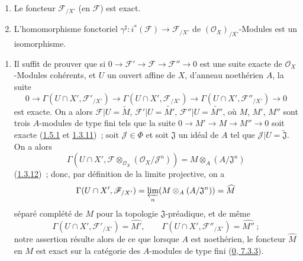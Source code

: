 \begin{proposition}[10.8.8]
\label{I.10.8.8-fr}
\medskip\noindent
\begin{enumerate}
  \item[\rm{(i)}] Le foncteur $\mathscr{F}_{/X'}$ (en $\mathscr{F}$) est
    exact.
  \item[\rm{(ii)}] L'homomorphisme fonctoriel
    $\gamma^\sharp:i^*(\mathscr{F})\to\mathscr{F}_{/X'}$ de
    $(\mathscr{O}_X)_{/X'}$-Modules est un isomorphisme.
\end{enumerate}
\end{proposition}

\medskip\noindent
\begin{enumerate}
  \item[\rm{(i)}] Il suffit de prouver que si
    $0\to\mathscr{F}'\to\mathscr{F}\to\mathscr{F}''\to0$ est une suite
    exacte de $\mathscr{O}_X$-Modules cohérents, et $U$ un ouvert affine
    de $X$, d'anneau noethérien $A$, la suite
    \[
      0\to\Gamma(U\cap X',\mathscr{F}'_{/X'})
      \to\Gamma(U\cap X',\mathscr{F}_{/X'})
      \to\Gamma(U\cap X',\mathscr{F}''_{/X'})\to0
    \]
    est exacte. On a alors $\mathscr{F}|U=\widetilde M$,
    $\mathscr{F}'|U=\widetilde{M'}$, $\mathscr{F}''|U=\widetilde{M''}$,
    où $M$, $M'$, $M''$ sont trois $A$-modules de type fini tels que la
    suite $0\to M'\to M\to M''\to0$ soit exacte
    (\hyperref[I.1.5.1-fr]{1.5.1} et
    \hyperref[I.1.3.11-fr]{1.3.11})~; soit $\mathscr{J}\in\Phi$ et soit
    $\mathfrak{J}$ un idéal de $A$ tel que
    $\mathscr{J}|U=\widetilde{\mathfrak{J}}$. On a alors
    \[
      \Gamma(U\cap X',
      \mathscr{F}\otimes_{\mathscr{O}_X}(\mathscr{O}_X/\mathscr{J}^n))
      =M\otimes_A(A/\mathfrak{J}^n)
    \]
    (\hyperref[I.1.3.12-fr]{1.3.12})~; donc, par définition de la limite
    projective, on a
    \[
      \Gamma(U\cap X',\mathscr{F}_{/X'})
      =\varprojlim_n(M\otimes_A(A/\mathfrak{J}^n))=\widehat M
    \]
    séparé complété de $M$ pour la topologie $\mathfrak{J}$-préadique, et
    de même
    \[
      \Gamma(U\cap X',\mathscr{F}'_{/X'})=\widehat{M'},\qquad
      \Gamma(U\cap X',\mathscr{F}''_{/X'})=\widehat{M''}~;
    \]
    notre assertion résulte alors de ce que lorsque $A$ est noethérien,
    le foncteur $\widehat M$ en $M$ est exact sur la catégorie des
    $A$-modules de type fini (\hyperref[0.7.3.3-fr]{0, 7.3.3}).


\end{enumerate}
